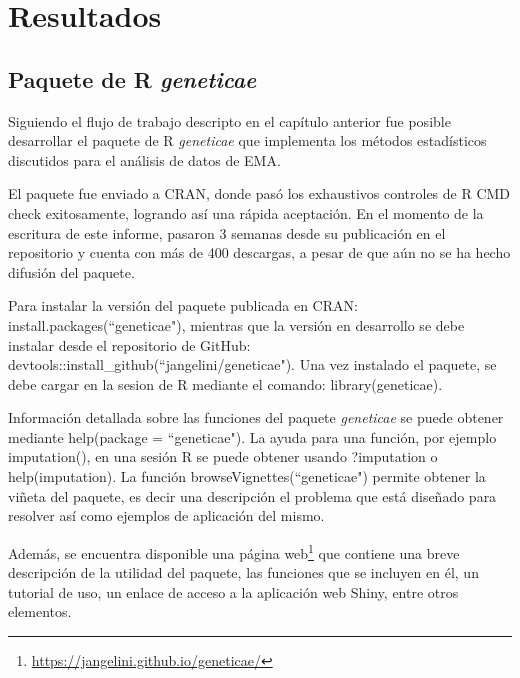

\chapter{Resultados}


\section{Paquete de R \emph{geneticae}}

Siguiendo el flujo de trabajo descripto en el capítulo anterior fue posible desarrollar el paquete de R \emph{geneticae} que implementa los métodos estadísticos discutidos para el análisis de datos de EMA.

El paquete fue enviado a CRAN, donde pasó los exhaustivos controles de R CMD check exitosamente, logrando así una rápida aceptación. En el momento de la escritura de este informe, pasaron 3 semanas desde su publicación en el repositorio y cuenta con más de 400 descargas, a pesar de que aún no se ha hecho difusión del paquete. 

Para instalar la versión del paquete publicada en CRAN:  \textcolor{fandango}{install.packages(``geneticae")}, mientras que la versión en desarrollo se debe instalar desde el repositorio de GitHub:  \textcolor{fandango}{devtools::install\_github(``jangelini/geneticae")}. Una vez instalado el paquete, se debe cargar en la sesion de R mediante el comando: \textcolor{fandango}{library(geneticae)}. 

Información detallada sobre las funciones del paquete \emph{geneticae} se puede obtener mediante \textcolor{fandango}{help(package = ``geneticae")}. La ayuda para una función, por ejemplo \textcolor{fandango}{imputation()}, en una sesión R se puede obtener usando \textcolor{fandango}{?imputation} o \textcolor{fandango}{help(imputation)}. La función \textcolor{fandango}{browseVignettes(``geneticae")} permite obtener la viñeta del paquete, es decir una descripción el problema que está diseñado para resolver así como ejemplos de aplicación del mismo. 

Además, se encuentra disponible una página web\footnote{\url{https://jangelini.github.io/geneticae/}} que contiene una breve descripción de la utilidad del paquete, las funciones que se incluyen en él, un tutorial de uso, un enlace de acceso a la aplicación web Shiny, entre otros elementos.


